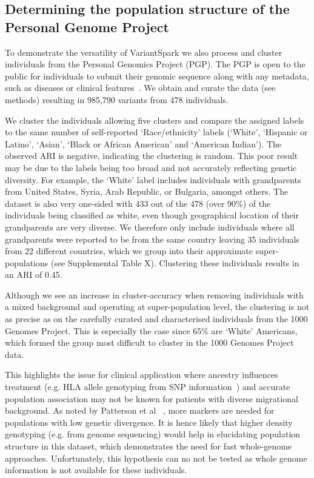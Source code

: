 \documentclass{bmcart}
\newcommand{\variantSpark}{{\sc VariantSpark}}
\begin{document}
\subsection*{Determining the population structure of the Personal Genome Project}
To demonstrate the versatility of \variantSpark{} we also process and cluster individuals from the Personal Genomics Project (PGP). The PGP is open to the public for individuals to submit their genomic sequence along with any metadata, such as diseases or clinical features~\cite{Lunshof2013}. 
We obtain and curate the data (see methods) resulting in 985,790 variants from 478 individuals.

We cluster the individuals allowing five clusters and compare the assigned labels to the same number of self-reported `Race/ethnicity' labels (`White', `Hispanic or Latino', `Asian', `Black or African American' and `American Indian').
The observed ARI is negative, indicating the clustering is random. 
This poor result may be due to the labels being too broad and not accurately reflecting genetic diversity. For example, the `White' label includes individuals with grandparents from United States, Syria, Arab Republic, or Bulgaria, amongst others. 
The dataset is also very one-sided with 433 out of the 478 (over 90\%) of the individuals being classified as white, even though geographical location of their grandparents are very diverse.
We therefore only include individuals where all grandparents were reported to be from the same country leaving 35 individuals from 22 different countries, which we group into their approximate super-populations (see Supplemental Table X). 
Clustering these individuals results in an ARI of 0.45. 

Although we see an increase in cluster-accuracy when removing individuals with a mixed background and operating at super-population level, the clustering is not as precise as on the carefully curated and characterised individuals from the 1000 Genomes Project.
This is especially the case since 65\% are `White' Americans, which formed the group most difficult to cluster in the 1000 Genomes Project data.

This highlights the issue for clinical application where ancestry influences treatment (e.g. HLA allele genotyping from SNP information~\cite{Zheng2014}) and accurate population association may not be known for patients with diverse migrational background.
As noted by Patterson et al ~\cite{Patterson2006}, more markers are needed for populations with low genetic divergence. 
It is hence likely that higher density genotyping (e.g. from genome sequencing) would help in elucidating population structure in this dataset, which demonstrates the need for fast whole-genome approaches. 
Unfortunately, this hypothesis can no not be tested as whole genome information is not available for these individuals. 
\end{document}
